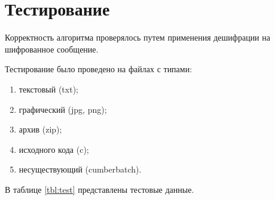 \section{Тестирование}
Корректность алгоритма проверялось путем применения дешифрации на шифрованное сообщение.

Тестирование было проведено на файлах с типами:

\begin{enumerate}[label=\arabic*)]
	\item текстовый (txt);
	\item графический (jpg, png);
	\item архив (zip);
	\item исходного кода (c);
	\item несуществующий (cumberbatch).
\end{enumerate}

В таблице \ref{tbl:test} представлены тестовые данные.

